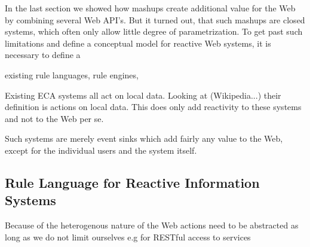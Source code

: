 


In the last section we showed how mashups create additional value for the Web by combining several Web API's.
But it turned out, that such mashups are closed systems, which often only allow little degree of parametrization.
To get past such limitations and define a conceptual model for reactive Web systems, it is necessary to define a 

existing rule languages, rule engines, 

Existing ECA systems all act on local data.
Looking at (Wikipedia...) their definition is actions on local data.
This does only add reactivity to these systems and not to the Web per se.

Such systems are merely event sinks which add fairly any value to the Web, except for the individual users and the system itself.



\subsection{Rule Language for Reactive Information Systems}
Because of the heterogenous nature of the Web actions need to be abstracted
as long as we do not limit ourselves e.g for RESTful access to services





